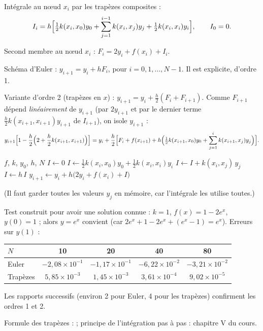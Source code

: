 \Etapes
{} Intégrale au nœud $x_i$ par les trapèzes composites :
\[
  I_i = h\Bigl[\tfrac12k(x_i,x_0)y_0 + \sum_{j=1}^{i-1} k(x_i,x_j)y_j
        + \tfrac12k(x_i,x_i)y_i\Bigr], \qquad I_0 = 0 .
\]

 Second membre au nœud $x_i$ : $F_i = 2y_i + f(x_i) + I_i$.

 Schéma d'Euler : $y_{i+1} = y_i + hF_i$, pour $i = 0, 1, \dots, N-1$.
Il est explicite, d'ordre 1.

 Variante d'ordre 2 (trapèzes en $x$) :
$y_{i+1} = y_i + \tfrac h2(F_i + F_{i+1})$. Comme $F_{i+1}$ dépend
\emph{linéairement} de $y_{i+1}$ (par $2y_{i+1}$ et par le dernier terme
$\tfrac h2k(x_{i+1},x_{i+1})y_{i+1}$ de $I_{i+1}$), on isole $y_{i+1}$ :
\[
  y_{i+1}\Bigl[1 - \frac h2\Bigl(2 + \frac h2k(x_{i+1},x_{i+1})\Bigr)\Bigr]
  = y_i + \frac h2\Bigl[F_i + f(x_{i+1})
    + h\Bigl(\tfrac12k(x_{i+1},x_0)y_0 + \sum_{j=1}^{i}k(x_{i+1},x_j)y_j\Bigr)\Bigr].
\]

\begin{algo}
  \Require $f$, $k$, $y_0$, $h$, $N$
    \State $I \leftarrow 0$
      \State $I \leftarrow \frac12k(x_i,x_0)y_0 + \frac12k(x_i,x_i)y_i$
       \State $I \leftarrow I + k(x_i,x_j)\,y_j$ \EndFor
      \State $I \leftarrow h\,I$
    \EndIf
    \State $y_{i+1} \leftarrow y_i + h\bigl(2y_i + f(x_i) + I\bigr)$
  \EndFor
\end{algo}
(Il faut garder toutes les valeurs $y_j$ en mémoire, car l'intégrale les
utilise toutes.)

\Verif Test construit pour avoir une solution connue : $k = 1$,
$f(x) = 1 - 2e^{x}$, $y(0) = 1$ ; alors $y = e^{x}$ convient (car
$2e^{x} + 1 - 2e^{x} + (e^{x} - 1) = e^{x}$). Erreurs sur $y(1)$ :
\begin{center}
\begin{tabular}{lcccc}
  \toprule
  $N$ & 10 & 20 & 40 & 80\\ \midrule
  Euler & $-2{,}08\times 10^{-1}$ & $-1{,}17\times 10^{-1}$ & $-6{,}22\times 10^{-2}$ & $-3{,}21\times 10^{-2}$\\
  Trapèzes & $5{,}85\times 10^{-3}$ & $1{,}45\times 10^{-3}$ & $3{,}61\times 10^{-4}$ & $9{,}02\times 10^{-5}$\\
  \bottomrule
\end{tabular}
\end{center}
Les rapports successifs (environ 2 pour Euler, 4 pour les trapèzes)
confirment les ordres 1 et 2.

\Refs Formule des trapèzes :  ; principe de l'intégration
pas à pas : chapitre V du cours.
